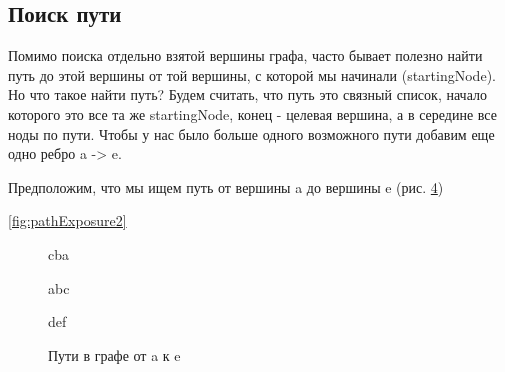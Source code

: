 \documentclass[../article.tex]{subfiles}
\begin{document}
\subsection{Поиск пути}

Помимо поиска отдельно взятой вершины графа, часто бывает полезно найти путь до этой вершины от той вершины, с которой мы начинали ({\firacodebold startingNode}). Но что такое найти путь? Будем считать, что путь это связный список, начало которого это все та же {\firacodebold startingNode}, конец - целевая вершина, а в середине все ноды по пути. Чтобы у нас было больше одного возможного пути добавим еще одно ребро {\firacodebold a -> e}.

Предположим, что мы ищем путь от вершины {\firacodebold a} до вершины {\firacodebold e} (рис. \ref{fig:pathExposure})

\ref{fig:pathExposure2}

\begin{figure*}
    \centering
    \begin{subfigure}{0.32\textwidth}
        \caption{cba}
        \label{fig:first}
    \end{subfigure}
    \begin{subfigure}{0.32\textwidth}
        \caption{abc}
        \label{fig:second}
    \end{subfigure}
    \begin{subfigure}{0.32\textwidth}
        \caption{def}
        \label{fig:third}
    \end{subfigure}
    \caption{Hbc}
\end{figure*}

\begin{figure}[H]
    \caption{Пути в графе от {\firacodebold a} к {\firacodebold e}}
    \label{fig:pathExposure}
\end{figure}
\end{document}
